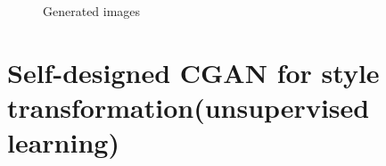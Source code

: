 \documentclass[11pt, a4paper]{article} %
\begin{document}
\begin{figure}[H]
    \hfill
    \caption{Generated images}
\end{figure}
\section{Self-designed CGAN for style transformation(unsupervised learning)}
\end{document}
